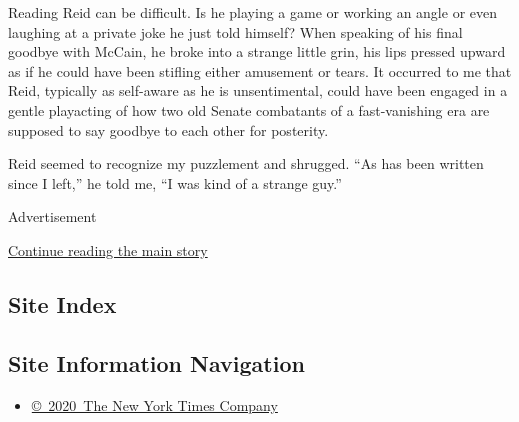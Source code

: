 Reading Reid can be difficult. Is he playing a game or working an angle
or even laughing at a private joke he just told himself? When speaking
of his final goodbye with McCain, he broke into a strange little grin,
his lips pressed upward as if he could have been stifling either
amusement or tears. It occurred to me that Reid, typically as self-aware
as he is unsentimental, could have been engaged in a gentle playacting
of how two old Senate combatants of a fast-vanishing era are supposed to
say goodbye to each other for posterity.

Reid seemed to recognize my puzzlement and shrugged. ``As has been
written since I left,'' he told me, ``I was kind of a strange guy.''

Advertisement

\protect\hyperlink{after-bottom}{Continue reading the main story}

\hypertarget{site-index}{%
\subsection{Site Index}\label{site-index}}

\hypertarget{site-information-navigation}{%
\subsection{Site Information
Navigation}\label{site-information-navigation}}

\begin{itemize}
\tightlist
\item
  \href{https://help.nytimes3xbfgragh.onion/hc/en-us/articles/115014792127-Copyright-notice}{©~2020~The
  New York Times Company}
\end{itemize}

